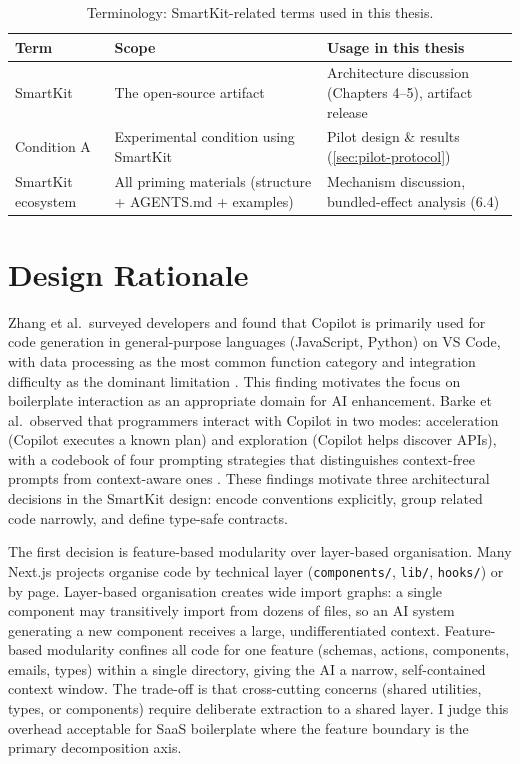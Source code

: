 \documentclass[12pt,a4paper]{report}
\DeclareRobustCommand{\filename}[1]{\bgroup\urlstyle{tt}\nolinkurl{#1}\egroup}
\begin{document}
\begin{table}[H]
\centering
\caption{Terminology: SmartKit-related terms used in this thesis.}
\label{tab:smartkit-glossary}
\small
\begin{tabular}{@{}lp{4cm}p{6.5cm}@{}}
\toprule
\textbf{Term} & \textbf{Scope} & \textbf{Usage in this thesis} \\
\midrule
SmartKit & The open-source artifact & Architecture discussion (Chapters 4--5), artifact release \\
Condition A & Experimental condition using SmartKit & Pilot design \& results (\autoref{sec:pilot-protocol}) \\
SmartKit ecosystem & All priming materials (structure + AGENTS.md + examples) & Mechanism discussion, bundled-effect analysis (6.4) \\
\bottomrule
\end{tabular}
\normalsize
\end{table}

\section{Design Rationale}
\label{sec:ch4-design-rationale}

Zhang et al.\ surveyed developers and found that Copilot is primarily used for code generation in general-purpose languages (JavaScript, Python) on VS Code, with data processing as the most common function category and integration difficulty as the dominant limitation \parencite{zhang2023practices}. This finding motivates the focus on boilerplate interaction as an appropriate domain for AI enhancement. Barke et al.\ observed that programmers interact with Copilot in two modes: acceleration (Copilot executes a known plan) and exploration (Copilot helps discover APIs), with a codebook of four prompting strategies that distinguishes context-free prompts from context-aware ones \parencite{barke2022grounded}. These findings motivate three architectural decisions in the SmartKit design: encode conventions explicitly, group related code narrowly, and define type-safe contracts.

The first decision is feature-based modularity over layer-based organisation. Many Next.js projects organise code by technical layer (\filename{components/}, \filename{lib/}, \filename{hooks/}) or by page. Layer-based organisation creates wide import graphs: a single component may transitively import from dozens of files, so an AI system generating a new component receives a large, undifferentiated context. Feature-based modularity confines all code for one feature (schemas, actions, components, emails, types) within a single directory, giving the AI a narrow, self-contained context window. The trade-off is that cross-cutting concerns (shared utilities, types, or components) require deliberate extraction to a shared layer. I judge this overhead acceptable for SaaS boilerplate where the feature boundary is the primary decomposition axis.
\end{document}
